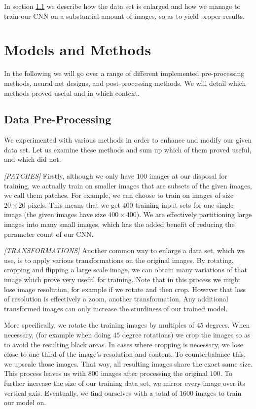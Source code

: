 \documentclass[10pt,conference,compsocconf]{IEEEtran}
\begin{document}
In section \ref{ssec:data_proc} we describe how the data set is enlarged and how we manage to train our CNN on a substantial amount of images, so as to yield proper results.


\section{Models and Methods}
\label{sec:methods}

In the following we will go over a range of different implemented pre-processing methods, neural net designs, and post-processing methods. We will detail which methods proved useful and in which context.

\subsection{Data Pre-Processing} 
\label{ssec:data_proc}

We experimented with various methods in order to enhance and modify our given data set. Let us examine these methods and sum up which of them proved useful, and which did not.

\textit{[PATCHES]}   
Firstly, although we only have $100$ images at our disposal for training, we actually train on smaller images that are subsets of the given images, we call them patches. For example, we can choose to train on images of size $20 \times 20$ pixels. This means that we get $400$ training input sets for one single image (the given images have size $400 \times 400$). We are effectively partitioning large images into many small images, which has the added benefit of reducing the parameter count of our CNN.

\textit{[TRANSFORMATIONS]}   
Another common way to enlarge a data set, which we use, is to apply various transformations on the original images. By rotating, cropping and flipping a large scale image, we can obtain many variations of that image which prove very useful for training. Note that in this process we might lose image resolution, for example if we rotate and then crop. However that loss of resolution is effectively a zoom, another transformation. Any additional transformed images can only increase the sturdiness of our trained model. 

More specifically, we rotate the training images by multiples of $45$ degrees. When necessary, (for example when doing $45$ degree rotations) we crop the images so as to avoid the resulting black areas. In cases where cropping is necessary, we lose close to one third of the image's resolution and content. To counterbalance this, we upscale those images. That way, all resulting images share the exact same size. This process leaves us with $800$ images after processing the original $100$. To further increase the size of our training data set, we mirror every image over its vertical axis. Eventually, we find ourselves with a total of $1600$ images to train our model on.
\end{document}
